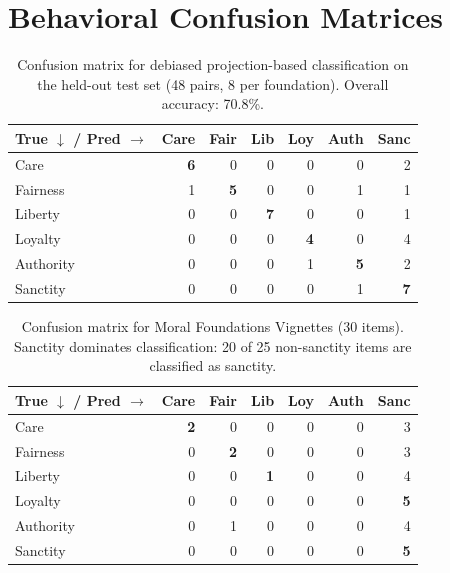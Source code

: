 \section{Behavioral Confusion Matrices}
\label{app:confusion-matrices}

\begin{table}[h]
\centering
\small
\begin{tabular}{l rrrrrr}
\toprule
True $\downarrow$ / Pred $\rightarrow$ & Care & Fair & Lib & Loy & Auth & Sanc \\
\midrule
Care      & \textbf{6} & 0 & 0 & 0 & 0 & 2 \\
Fairness  & 1 & \textbf{5} & 0 & 0 & 1 & 1 \\
Liberty   & 0 & 0 & \textbf{7} & 0 & 0 & 1 \\
Loyalty   & 0 & 0 & 0 & \textbf{4} & 0 & 4 \\
Authority & 0 & 0 & 0 & 1 & \textbf{5} & 2 \\
Sanctity  & 0 & 0 & 0 & 0 & 1 & \textbf{7} \\
\bottomrule
\end{tabular}
\caption{Confusion matrix for debiased projection-based classification on the held-out test set (48 pairs, 8 per foundation). Overall accuracy: 70.8\%.}
\label{tab:confusion-test}
\end{table}

\begin{table}[h]
\centering
\small
\begin{tabular}{l rrrrrr}
\toprule
True $\downarrow$ / Pred $\rightarrow$ & Care & Fair & Lib & Loy & Auth & Sanc \\
\midrule
Care      & \textbf{2} & 0 & 0 & 0 & 0 & 3 \\
Fairness  & 0 & \textbf{2} & 0 & 0 & 0 & 3 \\
Liberty   & 0 & 0 & \textbf{1} & 0 & 0 & 4 \\
Loyalty   & 0 & 0 & 0 & 0 & 0 & \textbf{5} \\
Authority & 0 & 1 & 0 & 0 & 0 & 4 \\
Sanctity  & 0 & 0 & 0 & 0 & 0 & \textbf{5} \\
\bottomrule
\end{tabular}
\caption{Confusion matrix for Moral Foundations Vignettes (30 items). Sanctity dominates classification: 20 of 25 non-sanctity items are classified as sanctity.}
\label{tab:confusion-mfv}
\end{table}

